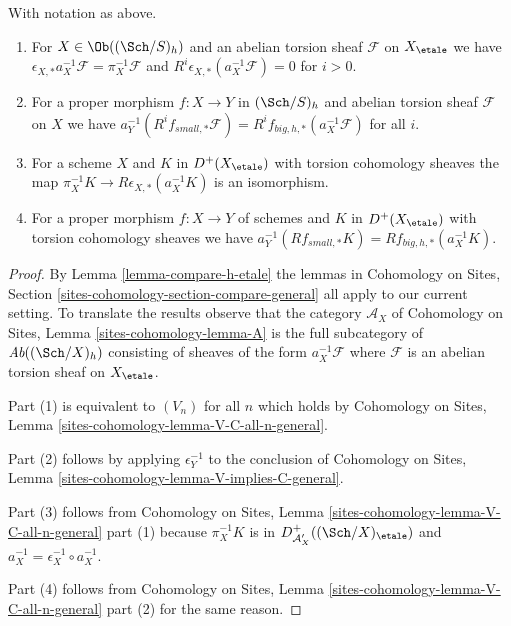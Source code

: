 \begin{lemma}
\label{lemma-V-C-all-n-etale-h}
With notation as above.
\begin{enumerate}
\item For $X \in \Ob((\Sch/S)_{h})$ and an abelian torsion sheaf $\mathcal{F}$
on $X_\etale$ we have
$\epsilon_{X, *}a_X^{-1}\mathcal{F} = \pi_X^{-1}\mathcal{F}$
and $R^i\epsilon_{X, *}(a_X^{-1}\mathcal{F}) = 0$ for $i > 0$.
\item For a proper morphism $f : X \to Y$ in $(\Sch/S)_h$
and abelian torsion sheaf $\mathcal{F}$ on $X$ we have
$a_Y^{-1}(R^if_{small, *}\mathcal{F}) =
R^if_{big, h, *}(a_X^{-1}\mathcal{F})$
for all $i$.
\item For a scheme $X$ and $K$ in $D^+(X_\etale)$ with torsion
cohomology sheaves the map
$\pi_X^{-1}K \to R\epsilon_{X, *}(a_X^{-1}K)$ is an isomorphism.
\item For a proper morphism $f : X \to Y$ of schemes
and $K$ in $D^+(X_\etale)$ with torsion cohomology sheaves we have
$a_Y^{-1}(Rf_{small, *}K) = Rf_{big, h, *}(a_X^{-1}K)$.
\end{enumerate}
\end{lemma}

\begin{proof}
By Lemma \ref{lemma-compare-h-etale} the lemmas in
Cohomology on Sites, Section \ref{sites-cohomology-section-compare-general}
all apply to our current setting. To translate the results
observe that the category $\mathcal{A}_X$ of
Cohomology on Sites, Lemma \ref{sites-cohomology-lemma-A}
is the full subcategory of $\textit{Ab}((\Sch/X)_h)$
consisting of sheaves of the form $a_X^{-1}\mathcal{F}$
where $\mathcal{F}$ is an abelian torsion sheaf on $X_\etale$.

\medskip\noindent
Part (1) is equivalent to $(V_n)$ for all $n$ which holds by
Cohomology on Sites, Lemma \ref{sites-cohomology-lemma-V-C-all-n-general}.

\medskip\noindent
Part (2) follows by applying $\epsilon_Y^{-1}$ to the conclusion of
Cohomology on Sites, Lemma \ref{sites-cohomology-lemma-V-implies-C-general}.

\medskip\noindent
Part (3) follows from Cohomology on Sites, Lemma
\ref{sites-cohomology-lemma-V-C-all-n-general} part (1)
because $\pi_X^{-1}K$ is in $D^+_{\mathcal{A}'_X}((\Sch/X)_\etale)$
and $a_X^{-1} = \epsilon_X^{-1} \circ a_X^{-1}$.

\medskip\noindent
Part (4) follows from Cohomology on Sites, Lemma
\ref{sites-cohomology-lemma-V-C-all-n-general} part (2)
for the same reason.
\end{proof}

